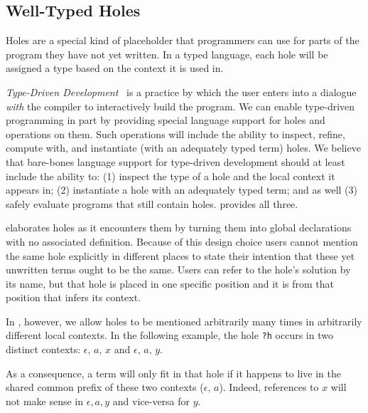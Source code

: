 \subsection{Well-Typed Holes}
\label{sec:design:holes}

Holes are a special kind of placeholder that programmers can use for parts of the program they have not yet written.
%
In a typed language, each hole will be assigned a type based on the context it is used in.

\emph{Type-Driven Development}~\cite{DBLP:journals/pacmpl/OmarVCH19}
is a practice by which the user enters into a dialogue
\emph{with} the compiler to interactively build the program.
%
We can enable type-driven programming in part by providing special language support for holes and operations on them.
Such operations will include the ability to inspect, refine, compute with, and instantiate (with an adequately typed term) holes.
%
We believe that bare-bones language support for type-driven development
should at least include the ability to:
%
(1) inspect the type of a hole and the local context it appears in;
%
(2) instantiate a hole with an adequately typed term;
%
and as well
%
(3) safely evaluate programs that still contain holes.
%
\Velo{} provides all three.

\Idris{} elaborates holes as it encounters them by turning them into
global declarations with no associated definition.
%
Because of this design choice users cannot mention the same hole explicitly in different places to state their intention that these yet unwritten terms ought to be the same.
%
Users can refer to the hole's solution by its name,
but that hole is placed in one specific position
and it is from that position that \Idris{} infers its context.

In \Velo{}, however, we allow holes to be mentioned arbitrarily many times in
arbitrarily different local contexts.
%
In the following example, the hole \texttt{?h} occurs in two distinct contexts:
$\epsilon,\,a,\,x$ and $\epsilon,\,a,\,y$.

\begin{center}
  \holeexamplegraph{}
\end{center}

As a consequence, a term will only fit in that hole if it happens to live in the shared common prefix of these two contexts ($\epsilon,\,a$).
%
Indeed, references to $x$ will not make sense in $\epsilon,a,y$ and vice-versa for $y$.


